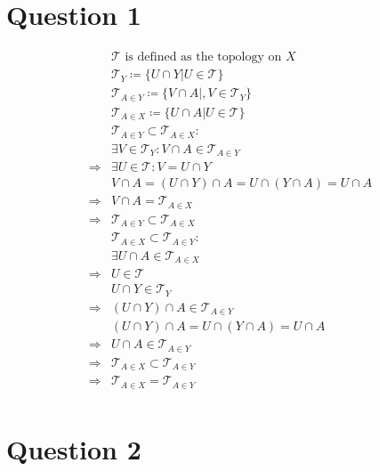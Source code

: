 \documentclass{article}
\begin{document}
\section*{Question 1}

\begin{equation*}
    \begin{split}
        &\mathcal{T} \text{ is defined as the topology on }X\\
        &\mathcal{T}_Y\coloneqq\{U\cap Y|U\in \mathcal{T} \}\\
        &\mathcal{T}_{A\in Y}\coloneqq\{V\cap A|,V\in \mathcal{T}_Y\}\\
        &\mathcal{T}_{A\in X}\coloneqq\{U\cap A|U\in\mathcal{T} \}\\
        &\mathcal{T}_{A\in Y}\subset\mathcal{T}_{A\in X}:\\
        &\exists V\in \mathcal{T}_Y :V\cap A\in\mathcal{T}_{A\in Y}\\
        \Rightarrow&\exists U\in\mathcal{T} : V=U\cap Y\\
        &V\cap A=(U\cap Y)\cap A=U\cap(Y\cap A)=U\cap A\\
        \Rightarrow&V\cap A=\mathcal{T}_{A\in X}\\
        \Rightarrow&\mathcal{T}_{A\in Y}\subset\mathcal{T}_{A\in X}\\
        &\mathcal{T}_{A\in X}\subset\mathcal{T}_{A\in Y}:\\
        &\exists U\cap A \in\mathcal{T}_{A\in X}\\
        \Rightarrow&U\in\mathcal{T} \\
        &U\cap Y\in\mathcal{T} _{Y}\\
        \Rightarrow&(U\cap Y)\cap A\in\mathcal{T}_{A\in Y}\\
        &(U\cap Y)\cap A=U\cap (Y\cap A)=U\cap A\\
        \Rightarrow&U\cap A\in\mathcal{T}_{A\in Y}\\
        \Rightarrow&\mathcal{T}_{A\in X}\subset\mathcal{T}_{A\in Y}\\
        \Rightarrow&\mathcal{T}_{A\in X}=\mathcal{T}_{A\in Y}\\
    \end{split}
\end{equation*}

\newpage

\section*{Question 2}
\end{document}
